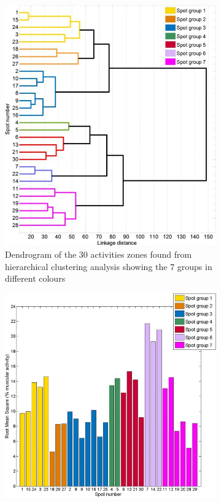\documentclass{article}
\begin{document}
\begin{figure}[H] 
\centering
\begin{subfigure}{.45 \textwidth}
    \centering
    \includegraphics[width=1\linewidth]{images/forearmActivityZonesDendrogram.png}
    \caption{Dendrogram of the 30 activities zones found from hierarchical clustering analysis showing the 7 groups in different colours}
    \label{fig:dendrogram}
\end{subfigure}%
\begin{subfigure}{.45 \textwidth}
    \centering
    \includegraphics[width=1\linewidth]{images/forearmActivityZonesRMS.png}

\end{subfigure}
\end{figure}
\end{document}
